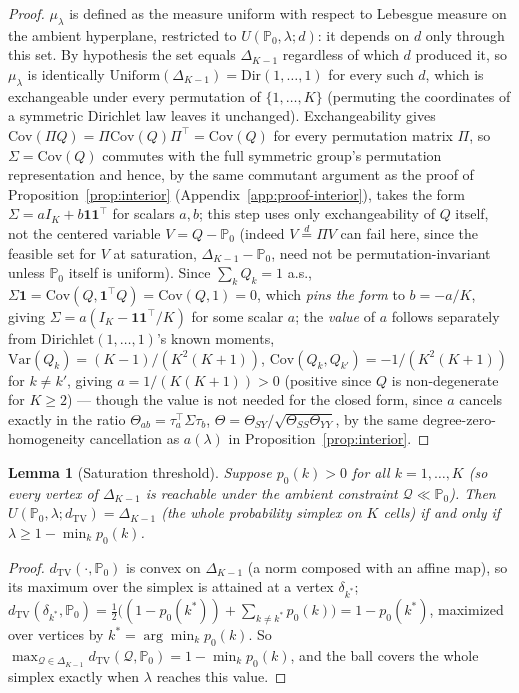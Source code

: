 \documentclass[11pt]{article}
\theoremstyle{plain}
\newtheorem{lemma}[theorem]{Lemma}
\theoremstyle{definition}
\theoremstyle{remark}
\newcommand{\PP}{\mathbb{P}}
\newcommand{\Q}{\mathcal{Q}}
\newcommand{\Cov}{\mathrm{Cov}}
\begin{document}
\begin{proof}
$\mu_\lambda$ is defined as the measure uniform with respect to Lebesgue measure on
the ambient hyperplane, restricted to $U(\PP_0,\lambda;d)$: it depends on $d$ only
through this set. By hypothesis the set equals $\Delta_{K-1}$ regardless of which
$d$ produced it, so $\mu_\lambda$ is identically
$\mathrm{Uniform}(\Delta_{K-1})=\mathrm{Dir}(1,\dots,1)$ for every such $d$, which is
exchangeable under every permutation of $\{1,\dots,K\}$ (permuting the coordinates
of a symmetric Dirichlet law leaves it unchanged). Exchangeability gives
$\Cov(\Pi Q)=\Pi\Cov(Q)\Pi^\top=\Cov(Q)$ for every permutation matrix $\Pi$, so
$\Sigma=\Cov(Q)$ commutes with the full symmetric group's permutation
representation and hence, by the same commutant argument as the proof of
Proposition~\ref{prop:interior} (Appendix~\ref{app:proof-interior}), takes the form
$\Sigma=aI_K+b\mathbf1\mathbf1^\top$ for scalars $a,b$; this step uses only
exchangeability of $Q$ itself, not the centered variable $V=Q-\PP_0$ (indeed
$V\stackrel d=\Pi V$ can fail here, since the feasible set for $V$ at saturation,
$\Delta_{K-1}-\PP_0$, need not be permutation-invariant unless $\PP_0$ itself is
uniform). Since $\sum_kQ_k=1$ a.s., $\Sigma\mathbf1=\Cov(Q,\mathbf1^\top Q)=\Cov(Q,1)=0$,
which \emph{pins the form} to $b=-a/K$, giving
$\Sigma=a(I_K-\mathbf1\mathbf1^\top/K)$ for some scalar $a$; the \emph{value} of $a$
follows separately from Dirichlet$(1,\dots,1)$'s known moments,
$\mathrm{Var}(Q_k)=(K-1)/(K^2(K+1))$, $\mathrm{Cov}(Q_k,Q_{k'})=-1/(K^2(K+1))$ for
$k\ne k'$, giving $a=1/(K(K+1))>0$ (positive since $Q$ is non-degenerate for
$K\ge2$) --- though the value is not needed for the closed form, since $a$ cancels
exactly in the ratio $\Theta_{ab}=\tau_a^\top\Sigma\tau_b$,
$\Theta=\Theta_{SY}/\sqrt{\Theta_{SS}\Theta_{YY}}$, by the same
degree-zero-homogeneity cancellation as $a(\lambda)$ in
Proposition~\ref{prop:interior}.
\end{proof}

\begin{lemma}[Saturation threshold]\label{lem:saturation}
Suppose $p_0(k)>0$ for all $k=1,\dots,K$ (so every vertex of $\Delta_{K-1}$ is
reachable under the ambient constraint $\Q\ll\PP_0$). Then
$U(\PP_0,\lambda;d_{\mathrm{TV}})=\Delta_{K-1}$ (the whole probability simplex on
$K$ cells) if and only if $\lambda\ge1-\min_kp_0(k)$.
\end{lemma}

\begin{proof}
$d_{\mathrm{TV}}(\cdot,\PP_0)$ is convex on $\Delta_{K-1}$ (a norm composed with an
affine map), so its maximum over the simplex is attained at a vertex $\delta_{k^*}$;
$d_{\mathrm{TV}}(\delta_{k^*},\PP_0)=\tfrac12\big((1-p_0(k^*))+\sum_{k\ne k^*}p_0(k)\big)=1-p_0(k^*)$,
maximized over vertices by $k^*=\arg\min_kp_0(k)$. So
$\max_{\Q\in\Delta_{K-1}}d_{\mathrm{TV}}(\Q,\PP_0)=1-\min_kp_0(k)$, and the ball
covers the whole simplex exactly when $\lambda$ reaches this value.
\end{proof}
\end{document}
